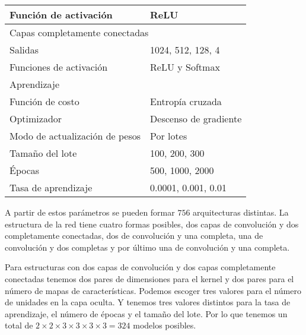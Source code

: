 \begin{table}[htbp]
\begin{tabular}{|l|l|}
Función de activación    & ReLU                                                                                                                                        \\ \hline
\multicolumn{2}{|l|}{Capas completamente conectadas}                                                                                                                   \\ \hline
Salidas                  & 1024, 512, 128, 4                                                                                                                               \\ \hline
Funciones de activación  & ReLU y Softmax                                                                                                                              \\ \hline
\multicolumn{2}{|l|}{Aprendizaje}                                                                                                                                      \\ \hline
Función de costo         & Entropía cruzada                                                                                                                            \\ \hline
Optimizador              & Descenso de gradiente                                                                                                                       \\ \hline
Modo de actualización de pesos & Por lotes
\\ \hline
Tamaño del lote & 100, 200, 300
\\ \hline
Épocas & 500, 1000, 2000
\\ \hline
Tasa de aprendizaje & 0.0001, 0.001, 0.01
\\ \hline
\end{tabular}

\end{table}

A partir de estos parámetros se pueden formar $756$ arquitecturas distintas. 
La estructura de la red tiene cuatro formas posibles, dos capas de convolución
y dos completamente conectadas, dos de convolución y una completa, una de convolución
y dos completas y por último una de convolución y una completa. 

Para estructuras con dos capas de convolución y dos capas completamente conectadas 
tenemos dos
pares de dimensiones para el kernel y dos pares para el número de mapas de 
características. Podemos escoger tres valores para el número de unidades 
en la capa oculta. Y tenemos tres valores distintos para la tasa de aprendizaje, 
el número de épocas y el tamaño del lote. Por lo que tenemos un total
de $2 \times 2 \times 3 \times 3 \times 3 \times 3 = 324$ modelos posibles. 

